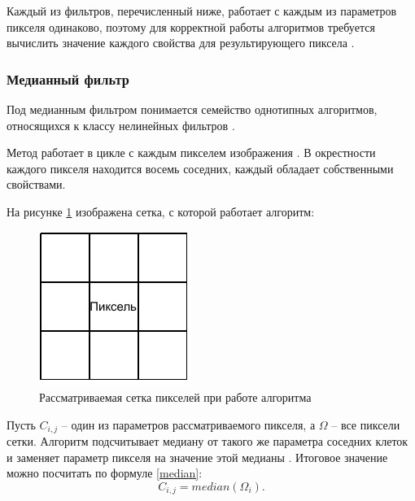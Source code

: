 Каждый из фильтров, перечисленный ниже, работает с каждым из параметров пикселя одинаково, поэтому для корректной работы алгоритмов требуется вычислить значение каждого свойства для результирующего пиксела \cite{filterTechincs}.

\subsubsection{Медианный фильтр}
Под медианным фильтром понимается семейство однотипных алгоритмов, относящихся к классу нелинейных фильтров \cite{median}.

Метод работает в цикле с каждым пикселем изображения \cite{filterTechincs}. 
В окрестности каждого пикселя находится восемь соседних, каждый обладает собственными свойствами. 

На рисунке \ref{fig::grid} изображена сетка, с которой работает алгоритм:

\FloatBarrier
\begin{figure}[h]	
	\begin{center}
		\includegraphics[]{inc/pdf/grid.pdf}
	\end{center}
	\captionsetup{justification=centering}
	\caption{Рассматриваемая сетка пикселей при работе алгоритма}
	\label{fig::grid}
\end{figure}
\FloatBarrier
\newpage

Пусть $C_{i, j}$ -- один из параметров рассматриваемого пикселя, а $\Omega$ -- все пиксели сетки.
Алгоритм подсчитывает медиану от такого же параметра соседних клеток и заменяет параметр пикселя на значение этой медианы \cite{median}.
Итоговое значение можно посчитать по формуле \eqref{median}: 
\begin{equation}
	\label{median}
	C_{i, j} = median(\Omega_i).
\end{equation}

